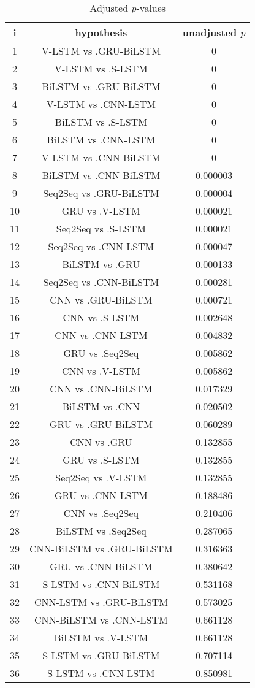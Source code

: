 \documentclass[a4paper,10pt]{article}
\begin{document}
\begin{landscape}
\begin{table}[!htp]
\centering\scriptsize
\begin{tabular}{ccc}
i&hypothesis&unadjusted $p$\\
\hline1&V-LSTM vs .GRU-BiLSTM&0\\
2&V-LSTM vs .S-LSTM&0\\
3&BiLSTM vs .GRU-BiLSTM&0\\
4&V-LSTM vs .CNN-LSTM&0\\
5&BiLSTM vs .S-LSTM&0\\
6&BiLSTM vs .CNN-LSTM&0\\
7&V-LSTM vs .CNN-BiLSTM&0\\
8&BiLSTM vs .CNN-BiLSTM&0.000003\\
9&Seq2Seq vs .GRU-BiLSTM&0.000004\\
10&GRU vs .V-LSTM&0.000021\\
11&Seq2Seq vs .S-LSTM&0.000021\\
12&Seq2Seq vs .CNN-LSTM&0.000047\\
13&BiLSTM vs .GRU&0.000133\\
14&Seq2Seq vs .CNN-BiLSTM&0.000281\\
15&CNN vs .GRU-BiLSTM&0.000721\\
16&CNN vs .S-LSTM&0.002648\\
17&CNN vs .CNN-LSTM&0.004832\\
18&GRU vs .Seq2Seq&0.005862\\
19&CNN vs .V-LSTM&0.005862\\
20&CNN vs .CNN-BiLSTM&0.017329\\
21&BiLSTM vs .CNN&0.020502\\
22&GRU vs .GRU-BiLSTM&0.060289\\
23&CNN vs .GRU&0.132855\\
24&GRU vs .S-LSTM&0.132855\\
25&Seq2Seq vs .V-LSTM&0.132855\\
26&GRU vs .CNN-LSTM&0.188486\\
27&CNN vs .Seq2Seq&0.210406\\
28&BiLSTM vs .Seq2Seq&0.287065\\
29&CNN-BiLSTM vs .GRU-BiLSTM&0.316363\\
30&GRU vs .CNN-BiLSTM&0.380642\\
31&S-LSTM vs .CNN-BiLSTM&0.531168\\
32&CNN-LSTM vs .GRU-BiLSTM&0.573025\\
33&CNN-BiLSTM vs .CNN-LSTM&0.661128\\
34&BiLSTM vs .V-LSTM&0.661128\\
35&S-LSTM vs .GRU-BiLSTM&0.707114\\
36&S-LSTM vs .CNN-LSTM&0.850981\\
\hline
\end{tabular}
\caption{Adjusted $p$-values}
\end{table}

\end{landscape}
\end{document}
